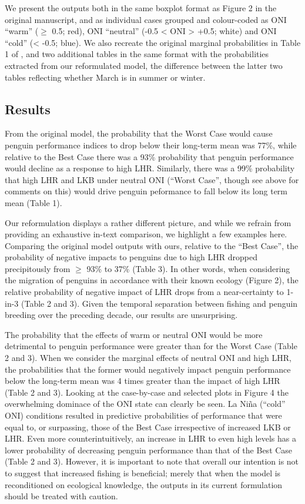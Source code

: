 \documentclass[]{elsarticle} %
\begin{document}
We present the outputs both in the same boxplot format as Figure 2 in
the original manuscript, and as individual cases grouped and
colour-coded as ONI ``warm'' (\(\geqslant\) 0.5; red), ONI ``neutral''
(-0.5 \textless{} ONI \textgreater{} +0.5; white) and ONI ``cold''
(\textless{} -0.5; blue). We also recreate the original marginal
probabilities in Table 1 of \citet{Watters2020}, and two additional
tables in the same format with the probabilities extracted from our
reformulated model, the difference between the latter two tables
reflecting whether March is in summer or winter.

\subsection{Results}\label{results}

From the original \citet{Watters2020} model, the probability that the
Worst Case would cause penguin performance indices to drop below their
long-term mean was 77\%, while relative to the Best Case there was a
93\% probability that penguin performance would decline as a response to
high LHR. Similarly, there was a 99\% probability that high LHR and LKB
under neutral ONI (``Worst Case'', though see above for comments on
this) would drive penguin peformance to fall below its long term mean
(Table 1).

Our reformulation displays a rather different picture, and while we
refrain from providing an exhaustive in-text comparison, we highlight a
few examples here. Comparing the original model outputs with ours,
relative to the ``Best Case'', the probability of negative impacts to
penguins due to high LHR dropped precipitously from \(\geqslant\) 93\%
to 37\% (Table 3). In other words, when considering the migration of
penguins in accordance with their known ecology (Figure 2), the relative
probability of negative impact of LHR drops from a near-certainty to
1-in-3 (Table 2 and 3). Given the temporal separation between fishing
and penguin breeding over the preceding decade, our results are
unsurprising.

The probability that the effects of warm or neutral ONI would be more
detrimental to penguin performance were greater than for the Worst Case
(Table 2 and 3). When we consider the marginal effects of neutral ONI
and high LHR, the probabilities that the former would negatively impact
penguin performance below the long-term mean was 4 times greater than
the impact of high LHR (Table 2 and 3). Looking at the case-by-case and
selected plots in Figure 4 the overwhelming dominace of the ONI state
can clearly be seen. La Niña (``cold'' ONI) conditions resulted in
predictive probabilities of performance that were equal to, or
surpassing, those of the Best Case irrespective of increased LKB or LHR.
Even more counterintuitively, an increase in LHR to even high levels has
a lower probability of decreasing penguin performance than that of the
Best Case (Table 2 and 3). However, it is important to note that overall
our intention is not to suggest that increased fishing is beneficial;
merely that when the model is reconditioned on ecological knowledge, the
outputs in its current formulation should be treated with caution.
\end{document}
